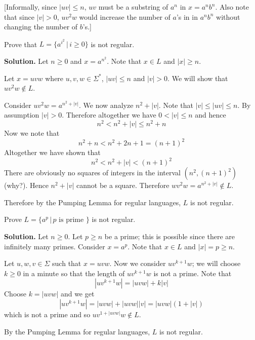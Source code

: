 [Informally,
since $|uv| \leq n$, $uv$ must be a substring of $a^n$ in $x = a^nb^n$.
Also note that since $|v| > 0$, $uv^2w$ would increase
the number of $a$'s in in $a^nb^n$ without changing the number of
$b$'s.]















\vspace{0.1in}



\newpage
\begin{eg}
Prove that $L = \{a^{i^2} \,|\, i \geq 0\}$ is not regular.

\textbf{Solution.} Let $n \geq 0$ and $x = a^{n^2}$. Note that $x \in
L$ and $|x| \geq n$.

Let $x = uvw$ where $u,v,w \in \Sigma^*$, $|uv| \leq n$ and $|v|>0$. We
will show that $uv^2w \notin L$.

Consider $uv^2w = a^{n^2+|v|}$. We now analyze $n^2+|v|$. Note
that $|v| \leq |uv|\leq n$. By assumption $|v|>0$. Therefore
altogether we have $0 < |v| \leq n$ and hence
\[
 n^2 < n^2 + |v| \leq n^2 + n
\]
Now we note that
\[
 n^2 + n < n^2 + 2n + 1 = (n+1)^2
\]
Altogether we have shown that
\[
 n^2 < n^2+|v| < (n+1)^2
\]
There are obviously no squares of integers in the interval
$(n^2,(n+1)^2)$ (why?). Hence $n^2+|v|$ cannot be a square.
Therefore $wv^2w = a^{n^2+|v|} \notin L$.

Therefore by the Pumping Lemma for regular languages, $L$ is not
regular.
\\
\end{eg}








\newpage
\begin{eg}
Prove $L = \{a^p \,|\, p \text{ is prime } \}$ is not regular.

\textbf{Solution.} Let $n \geq 0$. Let $p \geq n$ be a prime; this is
possible since there are infinitely many primes. Consider $x = a^p$.
Note that $x \in L$ and $|x| = p \geq n$.

Let $u,w,v \in \Sigma$ such that $x = uvw$. Now we consider
$uv^{k+1}w$; we will choose $k\geq 0$ in a minute so that the
length of $uv^{k+1}w$ is not a prime. Note that
\[
 |uv^{k+1}w| = |uvw| + k|v|
\]
Choose $k = |uvw|$ and we get
\[
|uv^{k+1}w| = |uvw| + |uvw||v| = |uvw|(1 + |v|)
\]
which is not a prime and so $uv^{1+|uvw|}w \notin L$.

By the Pumping Lemma for regular languages, $L$ is not regular.
\\
\end{eg}

